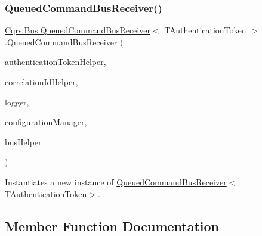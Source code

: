 \subsubsection{\texorpdfstring{Queued\+Command\+Bus\+Receiver()}{QueuedCommandBusReceiver()}}
{\footnotesize\ttfamily \hyperlink{classCqrs_1_1Bus_1_1QueuedCommandBusReceiver}{Cqrs.\+Bus.\+Queued\+Command\+Bus\+Receiver}$<$ T\+Authentication\+Token $>$.\hyperlink{classCqrs_1_1Bus_1_1QueuedCommandBusReceiver}{Queued\+Command\+Bus\+Receiver} (\begin{DoxyParamCaption}\item[{\hyperlink{interfaceCqrs_1_1Authentication_1_1IAuthenticationTokenHelper}{I\+Authentication\+Token\+Helper}$<$ T\+Authentication\+Token $>$}]{authentication\+Token\+Helper,  }\item[{I\+Correlation\+Id\+Helper}]{correlation\+Id\+Helper,  }\item[{I\+Logger}]{logger,  }\item[{\hyperlink{interfaceCqrs_1_1Configuration_1_1IConfigurationManager}{I\+Configuration\+Manager}}]{configuration\+Manager,  }\item[{\hyperlink{interfaceCqrs_1_1Bus_1_1IBusHelper}{I\+Bus\+Helper}}]{bus\+Helper }\end{DoxyParamCaption})\hspace{0.3cm}{\ttfamily [protected]}}



Instantiates a new instance of \hyperlink{classCqrs_1_1Bus_1_1QueuedCommandBusReceiver_aa5158357f8e2007f06b640d4a4129781_aa5158357f8e2007f06b640d4a4129781}{Queued\+Command\+Bus\+Receiver$<$\+T\+Authentication\+Token$>$}. 



\subsection{Member Function Documentation}
\mbox{\label{classCqrs_1_1Bus_1_1QueuedCommandBusReceiver_ad703e46b4a8318debac37ea747163f30_ad703e46b4a8318debac37ea747163f30}} 
